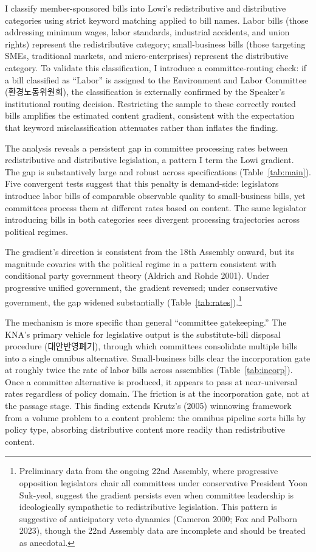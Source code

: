 \documentclass[11pt]{article}
\begin{document}
I classify member-sponsored bills into Lowi's redistributive and distributive categories using strict keyword matching applied to bill names. Labor bills (those addressing minimum wages, labor standards, industrial accidents, and union rights) represent the redistributive category; small-business bills (those targeting SMEs, traditional markets, and micro-enterprises) represent the distributive category. To validate this classification, I introduce a committee-routing check: if a bill classified as ``Labor'' is assigned to the Environment and Labor Committee (환경노동위원회), the classification is externally confirmed by the Speaker's institutional routing decision. Restricting the sample to these correctly routed bills amplifies the estimated content gradient, consistent with the expectation that keyword misclassification attenuates rather than inflates the finding.

The analysis reveals a persistent gap in committee processing rates between redistributive and distributive legislation, a pattern I term the Lowi gradient. The gap is substantively large and robust across specifications (Table~\ref{tab:main}). Five convergent tests suggest that this penalty is demand-side: legislators introduce labor bills of comparable observable quality to small-business bills, yet committees process them at different rates based on content. The same legislator introducing bills in both categories sees divergent processing trajectories across political regimes.

The gradient's direction is consistent from the 18th Assembly onward, but its magnitude covaries with the political regime in a pattern consistent with conditional party government theory (Aldrich and Rohde 2001). Under progressive unified government, the gradient reversed; under conservative government, the gap widened substantially (Table~\ref{tab:rates}).\footnote{Preliminary data from the ongoing 22nd Assembly, where progressive opposition legislators chair all committees under conservative President Yoon Suk-yeol, suggest the gradient persists even when committee leadership is ideologically sympathetic to redistributive legislation. This pattern is suggestive of anticipatory veto dynamics (Cameron 2000; Fox and Polborn 2023), though the 22nd Assembly data are incomplete and should be treated as anecdotal.}

The mechanism is more specific than general ``committee gatekeeping.'' The KNA's primary vehicle for legislative output is the substitute-bill disposal procedure (대안반영폐기), through which committees consolidate multiple bills into a single omnibus alternative. Small-business bills clear the incorporation gate at roughly twice the rate of labor bills across assemblies (Table~\ref{tab:incorp}). Once a committee alternative is produced, it appears to pass at near-universal rates regardless of policy domain. The friction is at the incorporation gate, not at the passage stage. This finding extends Krutz's (2005) winnowing framework from a volume problem to a content problem: the omnibus pipeline sorts bills by policy type, absorbing distributive content more readily than redistributive content.
\end{document}
